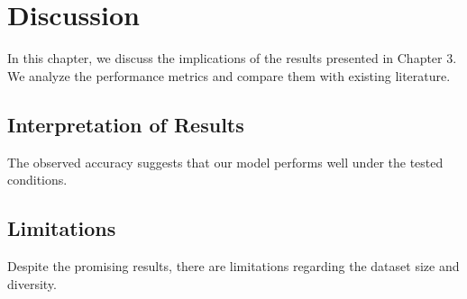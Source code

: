 \section{Discussion}
\label{sec:discussion}

In this chapter, we discuss the implications of the results presented in Chapter 3. We analyze the performance metrics and compare them with existing literature.

\subsection{Interpretation of Results}
The observed accuracy suggests that our model performs well under the tested conditions.

\subsection{Limitations}
Despite the promising results, there are limitations regarding the dataset size and diversity.
